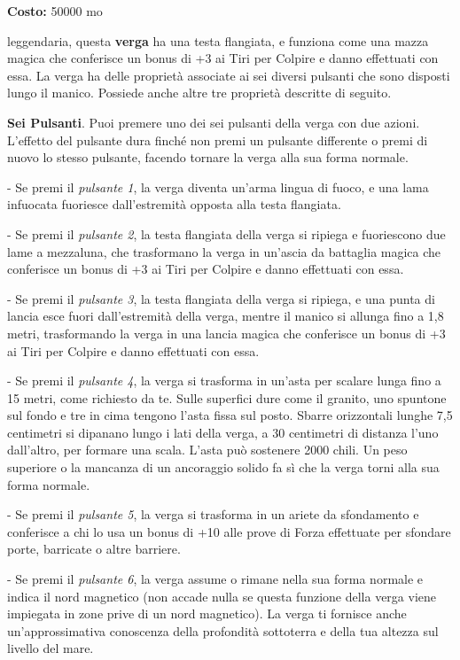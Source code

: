 \begin{multicols}{2}
\textbf{Costo:} 50000 mo

leggendaria, questa \textbf{verga} ha una testa flangiata, e funziona come una mazza magica che conferisce un bonus di +3 ai Tiri per Colpire e danno effettuati con essa. La verga ha delle proprietà associate ai sei diversi pulsanti che sono disposti lungo il manico. Possiede anche altre tre proprietà descritte di seguito.

\textbf{Sei Pulsanti}. Puoi premere uno dei sei pulsanti della verga con due azioni. L'effetto del pulsante dura finché non premi un pulsante differente o premi di nuovo lo stesso pulsante, facendo tornare la verga alla sua forma normale.

- Se premi il \emph{pulsante 1}, la verga diventa un'arma lingua di fuoco, e una lama infuocata fuoriesce dall'estremità opposta alla testa flangiata.

- Se premi il \emph{pulsante 2}, la testa flangiata della verga si ripiega e fuoriescono due lame a mezzaluna, che trasformano la verga in un'ascia da battaglia magica che conferisce un bonus di +3 ai Tiri per Colpire e danno effettuati con essa.

- Se premi il \emph{pulsante 3}, la testa flangiata della verga si ripiega, e una punta di lancia esce fuori dall'estremità della verga, mentre il manico si allunga fino a 1,8 metri, trasformando la verga in una lancia magica che conferisce un bonus di +3 ai Tiri per Colpire e danno effettuati con essa.

- Se premi il \emph{pulsante 4}, la verga si trasforma in un'asta per scalare lunga fino a 15 metri, come richiesto da te. Sulle superfici dure come il granito, uno spuntone sul fondo e tre in cima tengono l'asta fissa sul posto. Sbarre orizzontali lunghe 7,5 centimetri si dipanano lungo i lati della verga, a 30 centimetri di distanza l'uno dall'altro, per formare una scala. L'asta può sostenere 2000 chili. Un peso superiore o la mancanza di un ancoraggio solido fa sì che la verga torni alla sua forma normale.

- Se premi il \emph{pulsante 5}, la verga si trasforma in un ariete da sfondamento e conferisce a chi lo usa un bonus di +10 alle prove di Forza effettuate per sfondare porte, barricate o altre barriere.

- Se premi il \emph{pulsante 6}, la verga assume o rimane nella sua forma normale e indica il nord magnetico (non accade nulla se questa funzione della verga viene impiegata in zone prive di un nord magnetico). La verga ti fornisce anche un'approssimativa conoscenza della profondità sottoterra e della tua altezza sul livello del mare.


\end{multicols}
